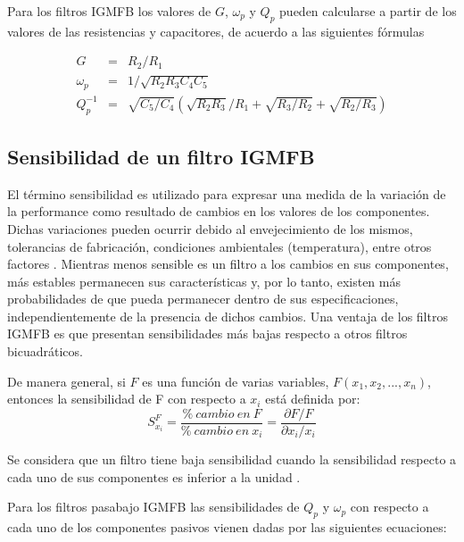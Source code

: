 \documentclass{llncs}
\begin{document}
	Para los filtros IGMFB los valores de $G$, $\omega_p$ y $Q_p$ pueden calcularse a partir
	de los valores de las resistencias y capacitores, de acuerdo a las siguientes fórmulas
	
	\begin{eqnarray}
		G &=& R_2/R_1 \label{g}\\
		\omega_p &=& 1/\sqrt{R_2 R_3 C_4 C_5} \label{omega}\\
		Q^{-1}_p &=& \sqrt{C_5/C_4}  \left(\sqrt{R_2 R_3}/R_1 + \sqrt{R_3/R_2} +
		\sqrt{R_2/R_3}\right) \label{q}
	\end{eqnarray}
	
	\subsection{Sensibilidad de un filtro IGMFB}
	El término sensibilidad es utilizado para expresar una medida de
	la variación de la performance como resultado de cambios en los valores de los
	componentes. Dichas variaciones pueden ocurrir debido al envejecimiento de los
	mismos, tolerancias de fabricación, condiciones ambientales (temperatura), entre
	otros factores \cite{dim,rau:swa}. Mientras menos sensible es un filtro a los cambios en sus
	componentes, más estables permanecen sus características y, por lo tanto, existen más
	probabilidades de que pueda permanecer dentro de sus especificaciones,
	independientemente de la presencia de dichos cambios. Una ventaja de los filtros IGMFB es
	que presentan sensibilidades más bajas respecto a otros filtros bicuadráticos.
	
	De manera general, si $F$ es una función de varias variables, $F(x_1, x_2,...,x_n)$, entonces
	la sensibilidad de F con respecto a $x_i$ está definida por:
	\begin{equation}
		S_{x_i}^F = \frac{\%\ cambio\ en\ F}{\%\ cambio\ en\ x_i} = \frac{\partial F/F}{\partial x_i/x_i}
		\label{sensibilidad}
	\end{equation}
	
	Se considera que un filtro tiene baja sensibilidad cuando la sensibilidad respecto a cada uno
	de sus componentes es inferior a la unidad \cite{rau:swa}.
	
	Para los filtros pasabajo IGMFB las sensibilidades de $Q_p$ y $\omega_p$ con respecto a cada uno de los componentes pasivos vienen dadas por las siguientes ecuaciones:
	
\end{document}
